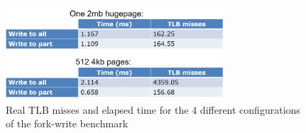 \begin{figure}
    \centering
    \includegraphics[width=3.2in]{Figures/Table1}
    \caption{Real TLB misses and elapsed time for the 4 different configurations of the fork-write benchmark}
    \label{fig:tables}
\end{figure}
